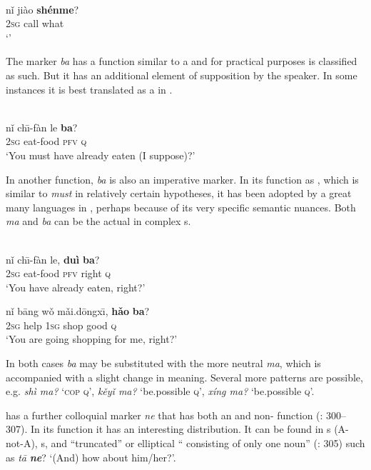 \ea%
    \label{ex:trans:4}
    \\
    \gll nǐ  jiào \textbf{{shénme}}?\\
    2\textsc{sg}  call  what\\
    \glt ‘’
    \z

The marker \textit{ba}  has a function similar to a  and for practical purposes is classified as such. But it has an additional element of supposition by the speaker. In some instances it is best translated as a  in .

\ea%
    \label{ex:trans:5}
    \\
    \gll nǐ  ch\={\i}-fàn    le \textbf{{ba}}?\\
    2\textsc{sg}  eat-food  \textsc{pfv}  \textsc{q}\\
    \glt ‘You must have already eaten (I suppose)?’
    \z

In another function, \textit{ba}  is also an imperative marker. In its function as , which is similar to  \textit{must} in relatively certain hypotheses, it has been adopted by a great many languages in , perhaps because of its very specific semantic nuances. Both \textit{ma} and \textit{ba} can be the actual  in complex s.

\ea%
    \label{ex:trans:6}
    \\
    \ea
    \gll nǐ  ch\={\i}-fàn    le, \textbf{duì} \textbf{ba}?\\
    2\textsc{sg}  eat-food  \textsc{pfv}    right  \textsc{q}\\
    \glt ‘You have already eaten, right?’
    
    \ex
    \gll nǐ  bāng  wǒ  mǎi.dōngx\={\i}, \textbf{hǎo}  \textbf{ba}?\\
    2\textsc{sg}  help  1\textsc{sg}  shop    good  \textsc{q}\\
    \glt ‘You are going shopping for me, right?’
    \z
    \z

\noindent In both cases \textit{ba} may be substituted with the more neutral \textit{ma}, which is accompanied with a slight change in meaning. Several more patterns are possible, e.g. \textit{shì ma?}  ‘\textsc{cop} \textsc{q}’, \textit{kěyǐ ma?}  ‘be.possible \textsc{q}’, \textit{xíng ma?}  ‘be.possible \textsc{q}’.

 has a further colloquial marker \textit{ne}  that has both an  and non- function (\citealt{LiThompson1981}: 300–307). In its  function it has an interesting distribution. It can be found in s (A-not-A), s, and “truncated” or elliptical “ consisting of only one noun” (\citealt{LiThompson1981}: 305) such as \textit{tā} \textbf{\textit{ne}}? ‘(And) how about him/her?’.


